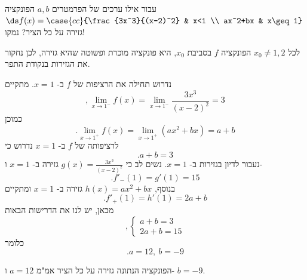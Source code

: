 עבור אילו ערכים של הפרמטרים $a,b$ הפונקציה $\ds f(x)=\case{cc}{\frac{3x^3}{(x-2)^2} & x<1 \\ ax^2+bx & x\geq 1}$ גזירה על כל הציר? נמקו!

\ifsol
{}
\begin{solbox}
לכל
$x_0\neq 1,2$
הפונקציה
$f$
בסביבת
$x_0$,
היא פונקציה מוכרת ופשוטה שהיא גזירה, לכן
נחקור את הגזירות בנקודת התפר.

נדרוש תחילה את הרציפות של
$f$
ב-
$x=1$.
מתקיים
$$,\lim_{x\to1^-}f(x)=\lim_{x\to1^-}\frac{3x^3}{(x-2)^2}=3$$
כמוכן
$$.\lim_{x\to1^+}f(x)=\lim_{x\to1^+}(ax^2+bx)=a+b$$
לרציפותה של
$f$
ב-
$x=1$
נדרוש כי
$$.a+b=3$$
נעבור לדיון בגזירות ב-
$x=1$.
נשים לב כי
$g(x)=\frac{3x^3}{(x-2)^2}$
גזירה ב-
$x=1$
ו-
$$.f'_-(1)=g'(1)=15$$
בנוסף,
$h(x)=ax^2+bx$
גזירה ב-
$x=1$
ומתקיים
$$.f'_+(1)=h'(1)=2a+b$$
מכאן, יש לנו את הדרישות הבאות
\[
,\begin{cases}
a+b=3\\
2a+b=15
\end{cases}
\]
כלומר
$$.a=12,\ b=-9$$

הפונקציה הנתונה גזירה על כל הציר אמ"מ
$a=12$
ו-
$b=-9$.
\end{solbox}
\fi
